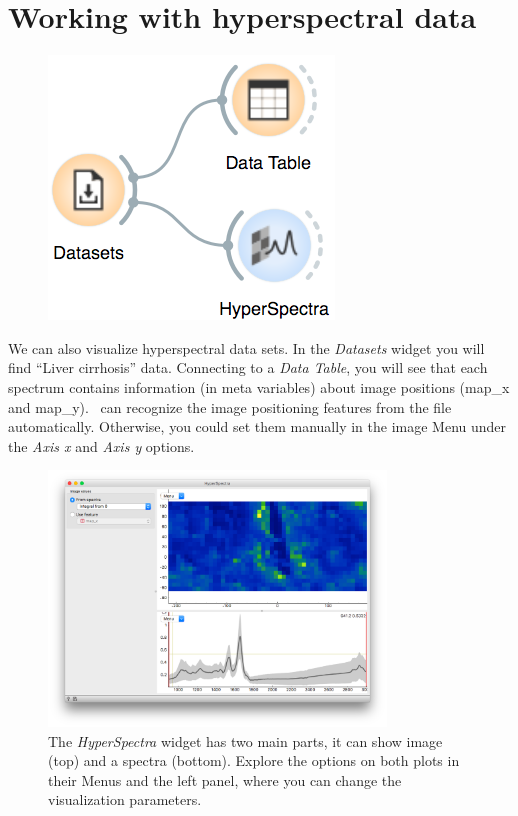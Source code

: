 \chapter{Working with hyperspectral data}
\label{ch:hyper_basic}


\begin{figure}
    \centering
    \vspace{-3cm}
    \includegraphics[scale=0.4]{hyperspectral-fig1.png}
    \label{fig:hyper_basic-fig1}
\end{figure}

We can also visualize hyperspectral data sets. In the \textit{Datasets} widget you will find “Liver cirrhosis” data. Connecting to a \textit{Data Table}, you will see that each spectrum contains information (in meta variables) about image positions (map\_x and map\_y). \mutation\ can recognize the image positioning features from the file automatically. Otherwise, you could set them manually in the image Menu under the \textit{Axis x} and \textit{Axis y} options. 

\begin{figure}[h]
    \centering
    \includegraphics[width=0.8\textwidth]{hyperspectral-fig2.png}
    \caption{The \textit{HyperSpectra} widget has two main parts, it can show image (top) and a spectra (bottom). Explore the options on both plots in their Menus and the left panel, where you can change the visualization parameters.}
    \label{fig:hyper_basic-fig2}
\end{figure}

